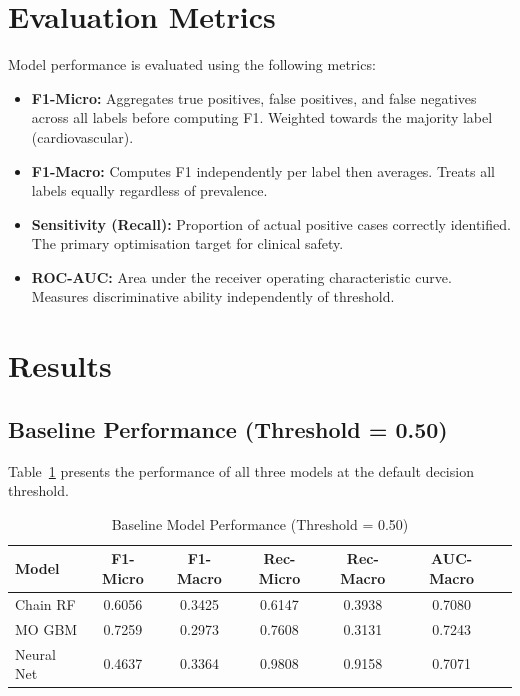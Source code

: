\documentclass[12pt]{article}
\begin{document}

\section{Evaluation Metrics}

Model performance is evaluated using the following metrics:

\begin{itemize}
  \item \textbf{F1-Micro:} Aggregates true positives, false positives, and false
        negatives across all labels before computing F1. Weighted towards the majority
        label (cardiovascular).
  \item \textbf{F1-Macro:} Computes F1 independently per label then averages. Treats
        all labels equally regardless of prevalence.
  \item \textbf{Sensitivity (Recall):} Proportion of actual positive cases correctly
        identified. The primary optimisation target for clinical safety.
  \item \textbf{ROC-AUC:} Area under the receiver operating characteristic curve.
        Measures discriminative ability independently of threshold.
\end{itemize}


\section{Results}

\subsection{Baseline Performance (Threshold = 0.50)}

Table~\ref{tab:baseline} presents the performance of all three models at the default
decision threshold.

\begin{table}[H]
  \centering
  \caption{Baseline Model Performance (Threshold = 0.50)}
  \label{tab:baseline}
  \begin{tabular}{lcccccc}
    \toprule
    Model & F1-Micro & F1-Macro & Rec-Micro & Rec-Macro & AUC-Macro \\
    \midrule
    Chain RF    & 0.6056 & 0.3425 & 0.6147 & 0.3938 & 0.7080 \\
    MO GBM      & 0.7259 & 0.2973 & 0.7608 & 0.3131 & 0.7243 \\
    Neural Net  & 0.4637 & 0.3364 & 0.9808 & 0.9158 & 0.7071 \\
    \bottomrule
  \end{tabular}
\end{table}
\end{document}
